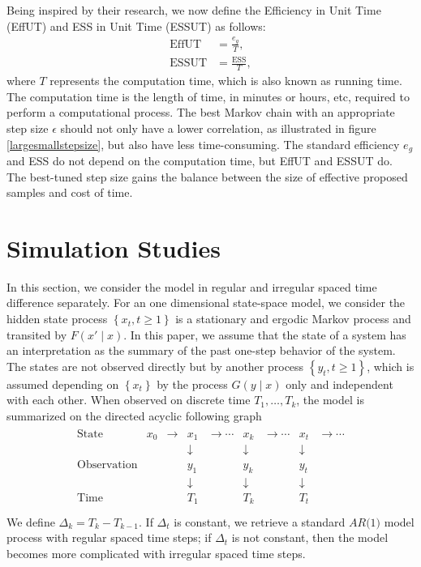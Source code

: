 Being inspired by their research, we now define the Efficiency in Unit Time (EffUT)  and ESS in Unit Time (ESSUT) as follows: 
\begin{align}
\mbox{EffUT}   &= \frac{e_g}{T},\\
\mbox{ESSUT} &= \frac{\mbox{ESS}}{T},
\end{align} 
where $T$ represents the computation time, which is also known as running time. The computation time is the length of time, in minutes or hours, etc, required to perform a computational process. The best Markov chain with an appropriate step size $\epsilon$ should not only have a lower correlation, as illustrated in figure \ref{largesmallstepsize}, but also have less time-consuming. The standard efficiency $e_g$ and ESS do not depend on the computation time, but EffUT and ESSUT do. The best-tuned step size gains the balance between the size of effective proposed samples and cost of time. 




\section{Simulation Studies}

In this section, we consider the model in regular and irregular spaced time difference separately. For an one dimensional state-space model, we consider the hidden state process $\left\lbrace x_t, t\geq 1\right\rbrace$ is a stationary and ergodic Markov process and transited by $F(x'\mid x)$. In this paper, we assume that the state of a system has an interpretation as the summary of the past one-step behavior of the system. The states are not observed directly but by another process $\left\lbrace y_t, t\geq 1\right\rbrace$, which is assumed depending on $\left\lbrace x_t\right\rbrace$ by the process $G(y\mid x)$ only and independent with each other. When observed on discrete time $T_1,\ldots,T_k$, the model is summarized on the directed acyclic following graph  
\begin{align*}
\begin{matrix}
\mbox{State}  & x_0     &  \rightarrow& x_1   & \rightarrow \cdots  & x_k  & \rightarrow \cdots & x_t & \rightarrow \cdots\\
          & &       & \downarrow &         &\downarrow &        &\downarrow &   \\
\mbox{Observation}& && y_1               &          & y_k               &        & y_t               &   \\
          & &      & \downarrow &          &\downarrow  &        &\downarrow &   \\
\mbox{Time } & &       & T_1               &          & T_k               &        & T_t               &   \\
\end{matrix}
\end{align*}
We define $\Delta_k = T_k-T_{k-1}$. If $\Delta_t$ is constant, we retrieve a standard  $\textit{AR(1)}$ model process with regular spaced time steps; if $\Delta_t$ is not constant, then the model becomes more complicated with irregular spaced time steps. 


